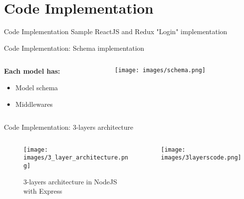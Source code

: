 \documentclass{beamer}
\begin{document}
\section{Code Implementation}
	
\begin{frame}{Code Implementation}
Sample ReactJS and Redux "Login" implementation
\end{frame}

\begin{frame}{Code Implementation: Schema implementation}
    \begin{columns}
    \hspace{-0.5cm}
    \vspace{-2cm}
    \begin{column}{4cm}
    \textbf{Each model has:}
    \begin{itemize}
        \item Model schema
        \item Middlewares
    \end{itemize}
    \end{column}
    
    \begin{column}{6cm}
    \texttt{[image: images/schema.png]}
    \end{column}
    \end{columns}
\end{frame}

\begin{frame}{Code Implementation: 3-layers architecture}
\begin{columns}
    \linespread{1.0}
    \hspace{-1cm}
     \begin{column}{5cm}
        \begin{figure}[htp]
            \centering
            \texttt{[image: images/3\_layer\_architecture.png]}
            \caption{3-layers architecture in NodeJS with Express}
            \label{fig:sysarch}
        \end{figure}  
    \end{column}
    \hspace{-1cm}
    \begin{column}{5cm}
        \texttt{[image: images/3layerscode.png]}
    \end{column}
    \end{columns}
\end{frame}
\end{document}
